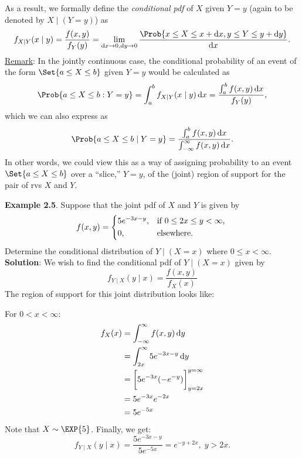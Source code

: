 As a result, we formally define the \emph{conditional pdf} of $ X $ given $ Y=y $ (again to be denoted by $ X\mid(Y=y) $) as
\[ f_{X\mid Y}(x\mid y)=\frac{f(x,y)}{f_Y(y)}=\lim\limits_{\odif{x}\to 0,\odif{y}\to 0}\frac{\Prob{x\le X\le x+\odif{x},y\le Y\le y+\odif{y}}}{\odif{x}}.  \]
\underline{Remark}: In the jointly continuous case, the conditional probability of an event of the form $ \Set{a\le X\le b} $ given $ Y=y $
would be calculated as
\[ \Prob{a\le X\le b\given Y=y}=\int_{a}^{b}f_{X\mid Y}(x\mid y)\odif{x}=\frac{\int_{a}^{b}f(x,y)\odif{x}}{f_Y(y)}, \]
which we can also express as
\[ \Prob{a\le X\le b\mid Y=y}=\frac{\int_{a}^{b}f(x,y)\odif{x}}{\int_{-\infty}^{\infty}f(x,y)\odif{x}}.  \]
In other words, we could view this as a way of assigning probability to an event
$ \Set{a\le X\le b} $ over a ``slice,'' $ Y=y $, of the (joint) region of support for the pair of rvs $ X $ and $ Y $.
\begin{Example}
    \textbf{Example 2.5}. Suppose that the joint pdf of $ X $ and $ Y $ is given by
    \[ f(x,y)=\begin{cases*}
            5e^{-3x-y}, & \text{if $ 0\le 2x\le y< \infty $,} \\
            0,          & \text{elsewhere}.
        \end{cases*} \]
    Determine the conditional distribution of $ Y\mid(X=x) $ where $ 0\le x< \infty $.
    \tcblower{}
    \textbf{Solution}: We wish to find the conditional pdf of $ Y\mid(X=x) $ given by
    \[f_{Y\mid X}(y\mid x)=\frac{f(x,y)}{f_X(x)}\]
    The region of support for this joint distribution looks like:
    \begin{center}
    \end{center}
    For $ 0<x<\infty $:
    \begin{align*}
        f_X(x)
         & =\int_{-\infty}^{\infty}f(x,y)\odif{y}             \\
         & =\int_{2x}^{\infty}5e^{-3x-y}\odif{y}              \\
         & =\biggl[5e^{-3x}(-e^{-y})\biggr]_{y=2x}^{y=\infty} \\
         & =5e^{-3x}e^{-2x}                                   \\
         & =5e^{-5x}
    \end{align*}
    Note that $ X \sim \EXP{5} $. Finally, we get:
    \[ f_{Y\mid X}(y\mid x)=\frac{5e^{-3x-y}}{5e^{-5x}}=e^{-y+2x},\; y> 2x.  \]
\end{Example}

